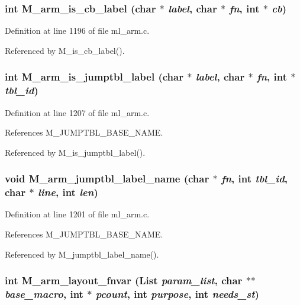\subsubsection{\setlength{\rightskip}{0pt plus 5cm}int M\_\-arm\_\-is\_\-cb\_\-label (char $\ast$ {\em label}, char $\ast$ {\em fn}, int $\ast$ {\em cb})}\label{ml__arm_8c_2ae88ec8de70409b26b551cb6878b9e4}




Definition at line 1196 of file ml\_\-arm.c.

Referenced by M\_\-is\_\-cb\_\-label().
\subsubsection{\setlength{\rightskip}{0pt plus 5cm}int M\_\-arm\_\-is\_\-jumptbl\_\-label (char $\ast$ {\em label}, char $\ast$ {\em fn}, int $\ast$ {\em tbl\_\-id})}\label{ml__arm_8c_a213a4eb3dbb08b56bf8cb926c2f93fc}




Definition at line 1207 of file ml\_\-arm.c.

References M\_\-JUMPTBL\_\-BASE\_\-NAME.

Referenced by M\_\-is\_\-jumptbl\_\-label().
\subsubsection{\setlength{\rightskip}{0pt plus 5cm}void M\_\-arm\_\-jumptbl\_\-label\_\-name (char $\ast$ {\em fn}, int {\em tbl\_\-id}, char $\ast$ {\em line}, int {\em len})}\label{ml__arm_8c_206b1021c25cf86a8cbf9b601b07b270}




Definition at line 1201 of file ml\_\-arm.c.

References M\_\-JUMPTBL\_\-BASE\_\-NAME.

Referenced by M\_\-jumptbl\_\-label\_\-name().
\subsubsection{\setlength{\rightskip}{0pt plus 5cm}int M\_\-arm\_\-layout\_\-fnvar (\bf{List} {\em param\_\-list}, char $\ast$$\ast$ {\em base\_\-macro}, int $\ast$ {\em pcount}, int {\em purpose}, int {\em needs\_\-st})}\label{ml__arm_8c_3bae55a86ac37cf02fb79eb56919719e}




